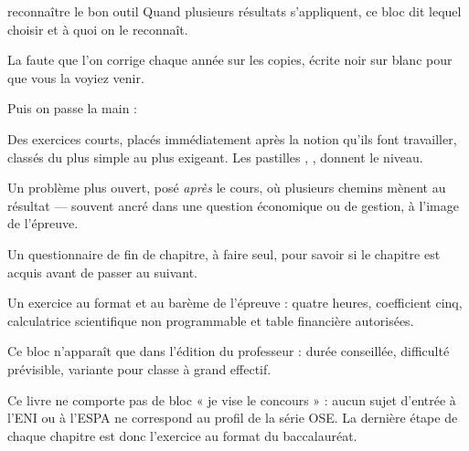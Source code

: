 \begin{methode}{reconnaître le bon outil}
Quand plusieurs résultats s'appliquent, ce bloc dit lequel choisir et à quoi
on le reconnaît.
\end{methode}

\begin{erreurclassique}
La faute que l'on corrige chaque année sur les copies, écrite noir sur blanc
pour que vous la voyiez venir.
\end{erreurclassique}

\noindent Puis on passe la main :

\begin{entrainement}
Des exercices courts, placés immédiatement après la notion qu'ils font
travailler, classés du plus simple au plus exigeant. Les pastilles
, ,  donnent le niveau.
\end{entrainement}

\begin{jecherche}
Un problème plus ouvert, posé \emph{après} le cours, où plusieurs chemins
mènent au résultat — souvent ancré dans une question économique ou de
gestion, à l'image de l'épreuve.
\end{jecherche}

\begin{jemeteste}
Un questionnaire de fin de chapitre, à faire seul, pour savoir si le chapitre
est acquis avant de passer au suivant.
\end{jemeteste}

\begin{commeaubac}
Un exercice au format et au barème de l'épreuve : quatre heures, coefficient
cinq, calculatrice scientifique non programmable et table financière
autorisées.
\end{commeaubac}

\begin{notepourlaclasse}
Ce bloc n'apparaît que dans l'édition du professeur : durée conseillée,
difficulté prévisible, variante pour classe à grand effectif.
\end{notepourlaclasse}

\begin{remarque}
Ce livre ne comporte pas de bloc « je vise le concours » : aucun sujet
d'entrée à l'ENI ou à l'ESPA ne correspond au profil de la série OSE. La
dernière étape de chaque chapitre est donc l'exercice au format du
baccalauréat.
\end{remarque}
